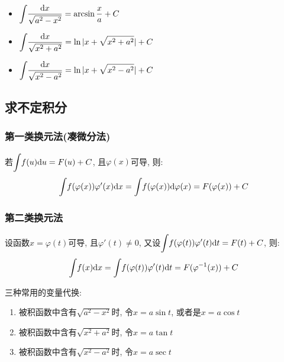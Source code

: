 \begin{multicols}{2}
\begin{itemize}
        \item $ \displaystyle\int_{}\hspace{.2em}\frac{\mathrm{d}x}{\sqrt{a^{2}-x^{2}}}=\arcsin \frac{x}{a}+C $
        \item $ \displaystyle\int_{}\hspace{.2em}\frac{\mathrm{d}x}{\sqrt{x^{2}+a^{2}}}=\ln|x+\sqrt{x^{2}+a^{2}}|+C $
        \item $ \displaystyle\int_{}\hspace{.2em}\frac{\mathrm{d}x}{\sqrt{x^{2}-a^{2}}}=\ln|x+\sqrt{x^{2}-a^{2}}|+C $
    \end{itemize}
\end{multicols}
\subsection{求不定积分}
\subsubsection{第一类换元法(凑微分法)}
若$ \displaystyle\int_{}\hspace{.2em}f(u)\mathrm{d}u=F(u)+C $, 且$ \varphi(x) $可导, 则:
\begin{equation*}
    \displaystyle\int_{}\hspace{.2em}f(\varphi(x))\varphi'(x)\mathrm{d}x=\displaystyle\int_{}\hspace{.2em}f(\varphi(x))\mathrm{d}\varphi(x)=F(\varphi(x))+C
\end{equation*}
\subsubsection{第二类换元法}
设函数$ x=\varphi(t) $可导, 且$ \varphi'(t)\neq 0 $, 又设$ \displaystyle\int_{}\hspace{.2em}f(\varphi(t))\varphi'(t)\mathrm{d}t=F(t)+C $, 则:
\begin{equation*}
    \displaystyle\int_{}\hspace{.2em}f(x)\mathrm{d}x=\displaystyle\int_{}\hspace{.2em}f(\varphi(t))\varphi'(t)\mathrm{d}t=F(\varphi^{-1}(x))+C
\end{equation*}
\begin{tcolorbox}
    三种常用的变量代换:
    \begin{enumerate}
        \item 被积函数中含有$ \sqrt{a^{2}-x^{2}} $时, 令$ x=a\sin t $, 或者是$ x=a\cos t $
        \item 被积函数中含有$ \sqrt{x^{2}+a^{2}} $时, 令$ x=a\tan t $
        \item 被积函数中含有$ \sqrt{x^{2}-a^{2}} $时, 令$ x=a\sec t $
    \end{enumerate}
\end{tcolorbox}
